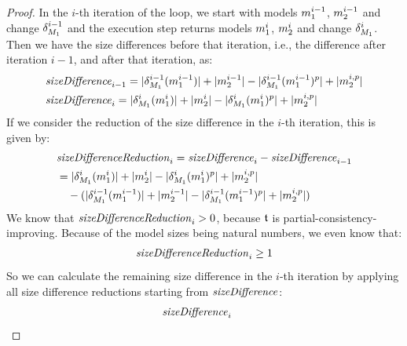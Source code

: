 \begin{proof}
    In the $i$-th iteration of the loop, we start with models $m_{1}^{i-1}$, $m_{2}^{i-1}$ and change $\delta_{M_{1}}^{i-1}$ and the execution step returns models $m_{1}^{i}$, $m_{2}^{i}$ and change $\delta_{M_{1}}^{i}$.
    Then we have the size differences before that iteration, i.e., the difference after iteration $i-1$, and after that iteration, as:
    \begin{align*}
        &
        \mathit{sizeDifference}_{i-1} = \lvert\delta_{M_{1}}^{i-1}(m_{1}^{i-1})\rvert + \lvert m_{2}^{i-1}\rvert - \lvert\delta_{M_{1}}^{i-1}(m_{1}^{i-1})^p\rvert + \lvert m_{2}^{i, p}\rvert \\
        &
        \mathit{sizeDifference}_{i} = \lvert\delta_{M_{1}}^{i}(m_{1}^{i})\rvert + \lvert m_{2}^{i}\rvert - \lvert\delta_{M_{1}}^{i}(m_{1}^{i})^p\rvert + \lvert m_{2}^{i,p}\rvert
    \end{align*}
    If we consider the reduction of the size difference in the $i$-th iteration, this is given by:
    \begin{align*}
        & 
        \mathit{sizeDifferenceReduction}_{i} = \mathit{sizeDifference}_{i} - \mathit{sizeDifference}_{i-1} \\
        & 
        = \lvert\delta_{M_{1}}^{i}(m_{1}^{i})\rvert + \lvert m_{2}^{i}\rvert - \lvert\delta_{M_{1}}^{i}(m_{1}^{i})^p\rvert + \lvert m_{2}^{i,p}\rvert \\
        & \hspace{1em}
        - (\lvert\delta_{M_{1}}^{i-1}(m_{1}^{i-1})\rvert + \lvert m_{2}^{i-1}\rvert - \lvert\delta_{M_{1}}^{i-1}(m_{1}^{i-1})^p\rvert + \lvert m_{2}^{i,p}\rvert)
    \end{align*}
    We know that $\mathit{sizeDifferenceReduction}_{i} > 0$, because $\mathfrak{t}$ is partial-consistency-improving. %
    Because of the model sizes being natural numbers, we even know that:
    \begin{align*}
        \mathit{sizeDifferenceReduction}_{i} \geq 1
    \end{align*}
    So we can calculate the remaining size difference in the $i$-th iteration by applying all size difference reductions starting from $\mathit{sizeDifference}$:
    \begin{align*}
        \mathvariable{sizeDifference}_{i} \; & 

\end{align*}
\end{proof}
